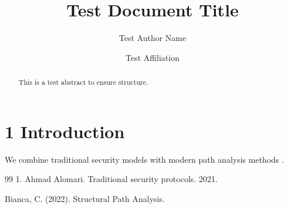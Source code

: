 \documentclass{default}
\begin{document}
\journalheader

\title{Test Document Title}
\author{Test Author Name \and Test Affiliation}
\date{}
\maketitle

\begin{abstract}
This is a test abstract to ensure structure.
\end{abstract}

\section{1 Introduction}

We combine traditional security models \cite{ref1} with modern path analysis methods \citep{ref2}.

\begin{thebibliography}{99}
1. Ahmad Alomari. Traditional security protocols. 2021.

Bianca, C. (2022). Structural Path Analysis.

\end{thebibliography}
\end{document}
